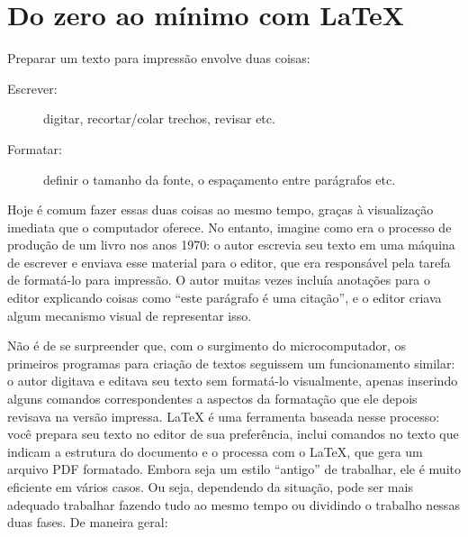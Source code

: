 \chapter{Do zero ao mínimo com \LaTeX{}}

Preparar um texto para impressão envolve duas coisas:

\begin{description}
\item[Escrever:] digitar, recortar/colar trechos, revisar etc.
\item[Formatar:] definir o tamanho da fonte, o
espaçamento entre parágrafos etc.
\end{description}

Hoje é comum fazer essas duas coisas ao mesmo tempo, graças à visualização
imediata que o computador oferece. No entanto, imagine como era o processo de
produção de um livro nos anos 1970: o autor escrevia seu texto em uma máquina
de escrever e enviava esse material para o editor, que era responsável pela
tarefa de formatá-lo para impressão. O autor muitas vezes incluía anotações
para o editor explicando coisas como ``este parágrafo é uma citação'', e o
editor criava algum mecanismo visual de representar isso.

Não é de se surpreender que, com o surgimento do microcomputador, os primeiros
programas para criação de textos seguissem um funcionamento similar: o autor
digitava e editava seu texto sem formatá-lo visualmente, apenas inserindo
alguns comandos correspondentes a aspectos da formatação que ele depois
revisava na versão impressa. \LaTeX{} é uma ferramenta baseada nesse processo:
você prepara seu texto no editor de sua preferência, inclui comandos no texto
que indicam a estrutura do documento e o processa com o \LaTeX{}, que gera um
arquivo PDF formatado. Embora seja um estilo ``antigo'' de trabalhar, ele é
muito eficiente em vários casos. Ou seja, dependendo da situação, pode ser
mais adequado trabalhar fazendo tudo ao mesmo tempo ou dividindo o trabalho
nessas duas fases. De maneira geral:

